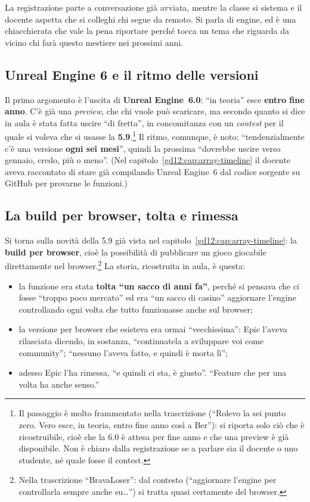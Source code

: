 La registrazione parte a conversazione già avviata, mentre la classe si
sistema e il docente aspetta che si colleghi chi segue da remoto. Si parla
di engine, ed è una chiacchierata che vale la pena riportare perché tocca un
tema che riguarda da vicino chi farà questo mestiere nei prossimi anni.

\subsection{Unreal Engine 6 e il ritmo delle versioni}

Il primo argomento è l'uscita di \textbf{Unreal Engine~6.0}: ``in teoria''
esce \textbf{entro fine anno}. C'è già una \emph{preview}, che chi vuole
può scaricare, ma secondo quanto si dice in aula è stata fatta uscire ``di
fretta'', in concomitanza con un \emph{contest} per il quale si voleva che si
usasse la \textbf{5.9}.\footnote{Il passaggio è molto frammentato nella
trascrizione (``Rolevo la sei punto zero. Vero esce, in teoria, entro fine anno
così a Ber''): si riporta solo ciò che è ricostruibile, cioè che la 6.0 è
attesa per fine anno e che una preview è già disponibile. Non è chiaro dalla
registrazione se a parlare sia il docente o uno studente, né quale fosse il
contest.} Il ritmo, comunque, è noto: ``tendenzialmente c'è una versione
\textbf{ogni sei mesi}'', quindi la prossima ``dovrebbe uscire verso
gennaio, credo, più o meno''. (Nel capitolo~\ref{gd12:cap:array-timeline}
il docente aveva raccontato di stare già compilando Unreal Engine~6 dal
codice sorgente su GitHub per provarne le funzioni.)

\subsection{La build per browser, tolta e rimessa}

Si torna sulla novità della 5.9 già vista nel
capitolo~\ref{gd12:cap:array-timeline}: la \textbf{build per browser}, cioè
la possibilità di pubblicare un gioco giocabile direttamente nel
browser.\footnote{Nella trascrizione ``BravaLoser'': dal contesto (``aggiornare
l'engine per controllarla sempre anche su\dots'') si tratta quasi certamente
del browser.} La storia, ricostruita in aula, è questa:
\begin{itemize}
  \item la funzione era stata \textbf{tolta ``un sacco di anni fa''}, perché
        si pensava che ci fosse ``troppo poco mercato'' ed era ``un sacco di
        casino'' aggiornare l'engine controllando ogni volta che tutto
        funzionasse anche sul browser;
  \item la versione per browser che esisteva era ormai ``vecchissima'': Epic
        l'aveva rilasciata dicendo, in sostanza, ``continuatela a sviluppare
        voi come community''; ``nessuno l'aveva fatto, e quindi è morta lì'';
  \item adesso Epic l'ha rimessa, ``e quindi ci sta, è giusto''. ``Feature
        che per una volta ha anche senso.''
\end{itemize}

